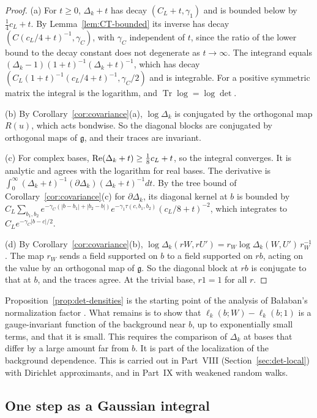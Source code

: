 \begin{proof}
(a) For $t\ge0$, $\Delta_k+t$ has decay $(C_L+t,\gamma_1)$ and is bounded below by $\frac14c_L+t$. By Lemma~\ref{lem:CT-bounded} its inverse has decay $(C(c_L/4+t)^{-1},\gamma_C)$, with $\gamma_C$ independent of $t$, since the ratio of the lower bound to the decay constant does not degenerate as $t\to\infty$. The integrand equals $(\Delta_k-1)(1+t)^{-1}(\Delta_k+t)^{-1}$, which has decay $(C_L(1+t)^{-1}(c_L/4+t)^{-1},\gamma_C/2)$ and is integrable. For a positive symmetric matrix the integral is the logarithm, and $\operatorname{Tr}\log=\log\det$.

(b) By Corollary~\ref{cor:covariance}(a), $\log\Delta_k$ is conjugated by the orthogonal map $R(u)$, which acts bondwise. So the diagonal blocks are conjugated by orthogonal maps of $\mathfrak g$, and their traces are invariant.

(c) For complex bases, $\operatorname{Re}(\Delta_k+t)\ge\frac18c_L+t$, so the integral converges. It is analytic and agrees with the logarithm for real bases. The derivative is $\int_0^\infty(\Delta_k+t)^{-1}(\partial\Delta_k)(\Delta_k+t)^{-1}dt$. By the tree bound of Corollary~\ref{cor:covariance}(c) for $\partial\Delta_k$, its diagonal kernel at $b$ is bounded by $C_L\sum_{b_1,b_2}e^{-\gamma_C(|b-b_1|+|b_2-b|)}e^{-\gamma_1\tau(c,b_1,b_2)}(c_L/8+t)^{-2}$, which integrates to $C_Le^{-\gamma_C|b-c|/2}$.

(d) By Corollary~\ref{cor:covariance}(b), $\log\Delta_k(rW,rU')=r_W\log\Delta_k(W,U')\,r_W^{-1}$. The map $r_W$ sends a field supported on $b$ to a field supported on $rb$, acting on the value by an orthogonal map of $\mathfrak g$. So the diagonal block at $rb$ is conjugate to that at $b$, and the traces agree. At the trivial base, $r1=1$ for all $r$.
\end{proof}

Proposition~\ref{prop:det-densities} is the starting point of the analysis of Ba\l aban's normalization factor \cite[(61)--(63)]{BalUV3}. What remains is to show that $\ell_k(b;W)-\ell_k(b;1)$ is a gauge-invariant function of the background near $b$, up to exponentially small terms, and that it is small. This requires the comparison of $\Delta_k$ at bases that differ by a large amount far from $b$. It is part of the localization of the background dependence. This is carried out in Part~VIII (Section~\ref{sec:det-local}) with Dirichlet approximants, and in Part~IX with weakened random walks.

\subsection{One step as a Gaussian integral}\label{ss:34.5}

